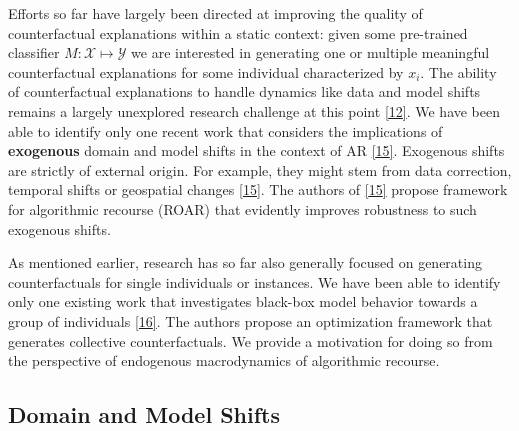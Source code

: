 \documentclass[
  conference]{IEEEtran}
\begin{document}
Efforts so far have largely been directed at improving the quality of
counterfactual explanations within a static context: given some
pre-trained classifier \(M: \mathcal{X} \mapsto \mathcal{Y}\) we are
interested in generating one or multiple meaningful counterfactual
explanations for some individual characterized by \(x_i\). The ability
of counterfactual explanations to handle dynamics like data and model
shifts remains a largely unexplored research challenge at this point
\protect\hyperlink{ref-verma2020counterfactual}{{[}12{]}}. We have been
able to identify only one recent work that considers the implications of
\textbf{exogenous} domain and model shifts in the context of AR
\protect\hyperlink{ref-upadhyay2021towards}{{[}15{]}}. Exogenous shifts
are strictly of external origin. For example, they might stem from data
correction, temporal shifts or geospatial changes
\protect\hyperlink{ref-upadhyay2021towards}{{[}15{]}}. The authors of
\protect\hyperlink{ref-upadhyay2021towards}{{[}15{]}} propose framework
for algorithmic recourse (ROAR) that evidently improves robustness to
such exogenous shifts.

As mentioned earlier, research has so far also generally focused on
generating counterfactuals for single individuals or instances. We have
been able to identify only one existing work that investigates black-box
model behavior towards a group of individuals
\protect\hyperlink{ref-carrizosa2021generating}{{[}16{]}}. The authors
propose an optimization framework that generates collective
counterfactuals. We provide a motivation for doing so from the
perspective of endogenous macrodynamics of algorithmic recourse.

\hypertarget{sec-related-shifts}{%
\subsection{Domain and Model Shifts}\label{sec-related-shifts}}
\end{document}
